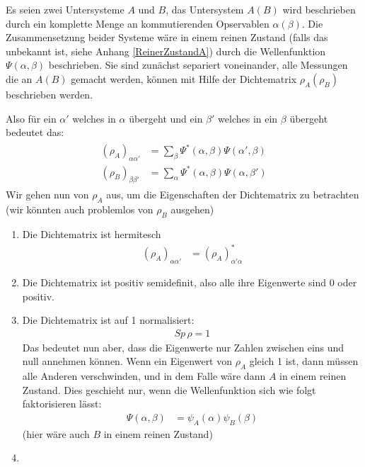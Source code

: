 \documentclass[ngerman]{scrartcl}
\begin{document}
	Es seien zwei Untersysteme $A$ und $B$, das Untersystem $A(B)$ wird beschrieben durch ein komplette Menge an kommutierenden Opservablen $\alpha(\beta)$. Die Zusammensetzung beider Systeme wäre in einem reinen Zustand (falls das unbekannt ist, siehe Anhang \ref{ReinerZustandA}) durch die Wellenfunktion $\Psi(\alpha,\beta)$ beschrieben. Sie sind zunächst separiert voneinander, alle Messungen die an $A(B)$ gemacht werden, können mit Hilfe der Dichtematrix $\rho_A(\rho_B)$ beschrieben werden.
	
	Also für ein $\alpha'$ welches in $\alpha$ übergeht und ein $\beta'$ welches in ein $\beta$ übergeht bedeutet das:
		\begin{align}
			\begin{aligned}
			(\rho_A)_{\alpha \alpha'} &=
			\sum_{\beta} \Psi^*(\alpha, \beta) \Psi(\alpha', \beta) \\
			(\rho_B)_{\beta \beta'} &= 
			\sum_{\alpha} \Psi^* (\alpha, \beta) \Psi (\alpha, \beta')
			\end{aligned}
		\end{align}
	Wir gehen nun von $\rho_A$ aus, um die Eigenschaften der Dichtematrix zu betrachten (wir könnten auch problemlos von $\rho_B$ ausgehen)
	\begin{enumerate}[1)]
		\item Die Dichtematrix ist hermitesch
			\begin{align}
				(\rho_A)_{\alpha \alpha'} &= (\rho_A)^*_{\alpha' \alpha}
			\end{align}
		\item Die Dichtematrix ist positiv semidefinit, also alle ihre Eigenwerte sind 0 oder positiv.
		\item Die Dichtematrix ist auf 1 normalisiert:
			\begin{align}
				Sp \, \rho = 1
			\end{align}
		Das bedeutet nun aber, dass die Eigenwerte nur Zahlen zwischen eins und null annehmen können. Wenn ein Eigenwert von $\rho_A$ gleich 1 ist, dann müssen alle Anderen verschwinden, und in dem Falle wäre dann $A$ in einem reinen Zustand. 
		Dies geschieht nur, wenn die Wellenfunktion sich wie folgt faktorisieren lässt:
			\begin{align}
				\Psi (\alpha, \beta) &= \psi_A(\alpha) \psi_B (\beta)
			\end{align} 
		(hier wäre auch $B$ in einem reinen Zustand)
		\item 
	\end{enumerate}
	
\end{document}
